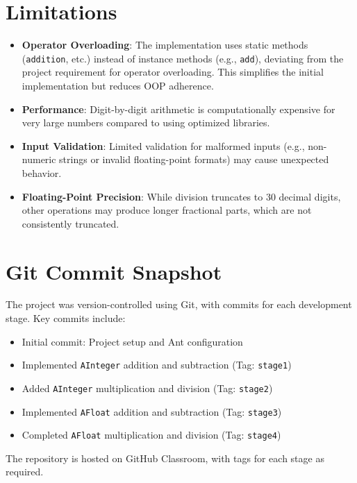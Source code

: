 \documentclass[12pt]{article}
\begin{document}
\section{Limitations}
\begin{itemize}
    \item \textbf{Operator Overloading}: The implementation uses static methods (\texttt{addition}, etc.) instead of instance methods (e.g., \texttt{add}), deviating from the project requirement for operator overloading. This simplifies the initial implementation but reduces OOP adherence.
    \item \textbf{Performance}: Digit-by-digit arithmetic is computationally expensive for very large numbers compared to using optimized libraries.
    \item \textbf{Input Validation}: Limited validation for malformed inputs (e.g., non-numeric strings or invalid floating-point formats) may cause unexpected behavior.
    \item \textbf{Floating-Point Precision}: While division truncates to 30 decimal digits, other operations may produce longer fractional parts, which are not consistently truncated.
\end{itemize}

\section{Git Commit Snapshot}
The project was version-controlled using Git, with commits for each development stage. Key commits include:

\begin{itemize}
    \item Initial commit: Project setup and Ant configuration
    \item Implemented \texttt{AInteger} addition and subtraction (Tag: \texttt{stage1})
    \item Added \texttt{AInteger} multiplication and division (Tag: \texttt{stage2})
    \item Implemented \texttt{AFloat} addition and subtraction (Tag: \texttt{stage3})
    \item Completed \texttt{AFloat} multiplication and division (Tag: \texttt{stage4})
\end{itemize}

The repository is hosted on GitHub Classroom, with tags for each stage as required.
\end{document}
